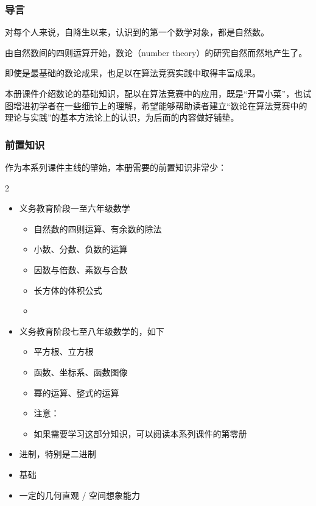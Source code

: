 
\begin{frame}
  \frametitle{导言}
  对每个人来说，自降生以来，认识到的第一个数学对象，都是自然数。
  \pause
  
  由自然数间的四则运算开始，数论（number theory）的研究自然而然地产生了。
  \pause
  
  \emptyline
  即使是最基础的数论成果，也足以在算法竞赛实践中取得丰富成果。
  \pause
  
  本册课件介绍数论的基础知识，配以在算法竞赛中的应用，既是“开胃小菜”，也试图增进初学者在一些细节上的理解，希望能够帮助读者建立“数论在算法竞赛中的理论与实践”的基本方法论上的认识，为后面的内容做好铺垫。
\end{frame}
\begin{frame}
  \frametitle{前置知识}
  作为本系列课件主线的肇始，本册需要的前置知识非常少：
  \begin{mymulticols}[l][l]{2}
    \begin{itemize}
      \item 义务教育阶段一至六年级数学
      \begin{itemize}
        \item 自然数的四则运算、有余数的除法
        \item 小数、分数、负数的运算
        \item 因数与倍数、素数与合数
        \item 长方体的体积公式
        \item {}
      \end{itemize}
      \item 义务教育阶段七至八年级数学的，如下
      \begin{itemize}
        \item 平方根、立方根
        \item 函数、坐标系、函数图像
        \item 幂的运算、整式的运算
        \item 注意：
        \item 如果需要学习这部分知识，可以阅读本系列课件的第零册
      \end{itemize}
    \end{itemize}
  \end{mymulticols}
  \begin{itemize}
    \item 进制，特别是二进制
    \item \Cpp{} 基础
    \item 一定的几何直观 / 空间想象能力
  \end{itemize}
\end{frame}
